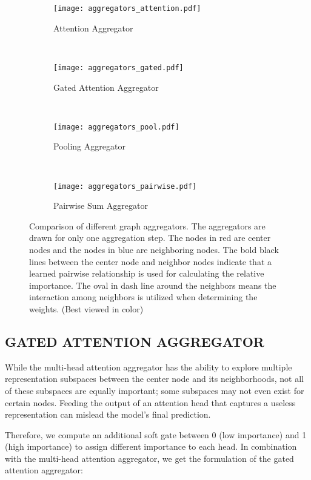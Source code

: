 \documentclass{article}
\begin{document}
	\begin{figure*}[tb!]
		\centering
		\begin{subfigure}[b]{0.213\textwidth}
			\centering
			\texttt{[image: aggregators\_attention.pdf]}
			\caption{ Attention Aggregator}\label{fig:attention}
		\end{subfigure}
		~
		\begin{subfigure}[b]{0.29\textwidth}
			\centering
			\texttt{[image: aggregators\_gated.pdf]}
			\caption{Gated Attention Aggregator}\label{fig:gated_attention}
		\end{subfigure}
		~
		\begin{subfigure}[b]{0.185\textwidth}
			\centering
			\texttt{[image: aggregators\_pool.pdf]}
			\caption{Pooling Aggregator}\label{fig:pooling}
		\end{subfigure}
		~
		\begin{subfigure}[b]{0.23\textwidth}
			\centering
			\texttt{[image: aggregators\_pairwise.pdf]}
			\caption{ Pairwise Sum Aggregator}\label{fig:pairwise}
		\end{subfigure}
		\caption{Comparison of different graph aggregators. The aggregators are drawn for only one aggregation step. The nodes in red are center nodes and the nodes in blue are neighboring nodes. The bold black lines between the center node and neighbor nodes indicate that a learned pairwise relationship is used for calculating the relative importance. The oval in dash line around the neighbors means the interaction among neighbors is utilized when determining the weights. (Best viewed in color)}
		\label{fig:aggregators}
\end{figure*}
	
\subsection{GATED ATTENTION AGGREGATOR}
	While the multi-head attention aggregator has the ability to explore multiple representation subspaces between the center node and its neighborhoods, not all of these subspaces are equally important; some subspaces may not even exist for certain nodes. Feeding the output of an attention head that captures a useless representation can mislead the model's final prediction.
	
Therefore, we compute an additional soft gate between 0 (low importance) and 1 (high importance) to assign different importance to each head. In combination with the multi-head attention aggregator, we get the formulation of the gated attention aggregator:
	
\end{document}
